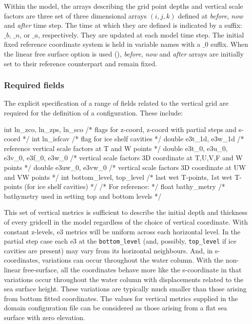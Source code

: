 \documentclass[../main/NEMO_manual]{subfiles}
\begin{document}
Within the model,
the arrays describing the grid point depths and vertical scale factors are
three set of three dimensional arrays $(i,j,k)$ defined at
\textit{before}, \textit{now} and \textit{after} time step.
The time at which they are defined is indicated by a suffix: $\_b$, $\_n$, or $\_a$, respectively.
They are updated at each model time step.
The initial fixed reference coordinate system is held in variable names with a $\_0$ suffix.
When the linear free surface option is used (),
\textit{before}, \textit{now} and \textit{after} arrays are initially set to
their reference counterpart and remain fixed.

\subsubsection{Required fields}
\label{sec:DOM_zgr_fields}

The explicit specification of a range of fields related to the vertical grid are required for
the definition of a configuration.
These include:

\begin{clines}
int    ln_zco, ln_zps, ln_sco            /* flags for z-coord, z-coord with partial steps and s-coord    */
int    ln_isfcav                         /* flag  for ice shelf cavities                                 */
double e3t_1d, e3w_1d                    /* reference vertical scale factors at T and W points           */
double e3t_0, e3u_0, e3v_0, e3f_0, e3w_0 /* vertical scale factors 3D coordinate at T,U,V,F and W points */
double e3uw_0, e3vw_0                    /* vertical scale factors 3D coordinate at UW and VW points     */
int    bottom_level, top_level           /* last wet T-points, 1st wet T-points (for ice shelf cavities) */
                                         /* For reference:                                               */
float  bathy_metry                       /* bathymetry used in setting top and bottom levels             */
\end{clines}

This set of vertical metrics is sufficient to describe the initial depth and thickness of
every gridcell in the model regardless of the choice of vertical coordinate.
With constant z-levels, e3 metrics will be uniform across each horizontal level.
In the partial step case each e3 at the \texttt{bottom\_level}
(and, possibly, \texttt{top\_level} if ice cavities are present)
may vary from its horizontal neighbours.
And, in s-coordinates, variations can occur throughout the water column.
With the non-linear free-surface, all the coordinates behave more like the s-coordinate in that
variations occur throughout the water column with displacements related to the sea surface height.
These variations are typically much smaller than those arising from bottom fitted coordinates.
The values for vertical metrics supplied in the domain configuration file can be considered as
those arising from a flat sea surface with zero elevation.
\end{document}
